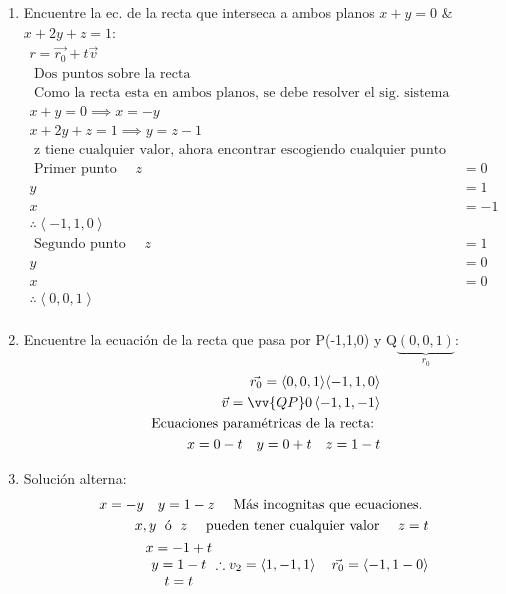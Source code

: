 \begin{enumerate}
    \item Encuentre la ec. de la recta que interseca a ambos planos $x+y=0$ \& $x+2y+z=1$: 
        \begin{align*}
            r = \vec{r_0} + t \vec{v} \\ 
            \text{  Dos puntos sobre la recta  } \\ 
            \text{  Como la recta esta en ambos planos, se debe resolver el sig. sistema de ecuaciones  } \\ 
            x + y = 0 \implies x=-y \\ 
            x+2y+z=1 \implies y = z-1 \\ 
            \text{  z tiene cualquier valor, ahora encontrar escogiendo cualquier punto sobre la recta, en este caso 0   } \\ 
            \text{  Primer punto   } \quad z & = 0 \\
            y &= 1\\ 
            x & = -1 \\ 
            \therefore \left\langle -1,1,0 \right\rangle \\ 
            \text{  Segundo punto  } \quad z &= 1 \\ 
            y & = 0 \\ 
            x & = 0 \\ 
            \therefore \left\langle 0,0,1 \right\rangle \\ 
        \end{align*}
    
    \item Encuentre la ecuación de la recta que pasa por P(-1,1,0) y Q$\underbrace{(0,0,1)}_{r_0}$:
        \begin{align*}
            \vec{r_0} = \left\langle 0,0,1 \right\rangle \! \left\langle -1,1,0 \right\rangle \\ 
            \vec{v} = \vv{QP} 0 \left\langle -1,1,-1 \right\rangle \\ 
            \text{  Ecuaciones paramétricas de la recta:  } \\ 
            x = 0-t \quad y = 0 + t \quad z = 1-t \\ 
        \end{align*}
    
    \item Solución alterna:
        \begin{align*}
            x = -y \quad y = 1-z \quad \text{  Más incognitas que ecuaciones.  }\\
            x,y \; \text{  ó   }\; z \text{  \quad pueden tener cualquier valor  } \quad z=t \\ 
            \begin{matrix}
                x = -1 + t \\ 
                y = 1 - t \\ 
                t = t \\ 
            \end{matrix} \therefore v_2 = \left\langle 1,-1,1 \right\rangle  \quad \vec{r_0} = \left\langle -1,1-0 \right\rangle \\ 
        \end{align*}
    

\end{enumerate}
